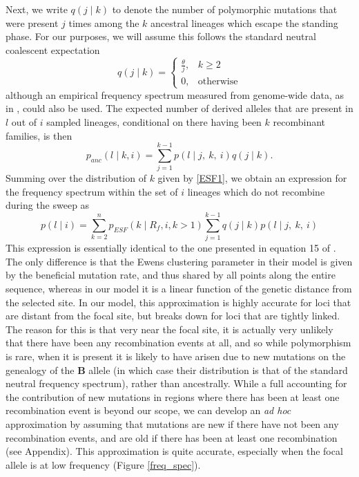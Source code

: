 \documentclass[a4paper,10pt]{article}
\begin{document}
Next, we write $q\left(j \mid k\right)$ to denote the number of polymorphic mutations that were present $j$ times among the $k$ ancestral lineages which escape the standing phase. For our purposes, we will assume this follows the standard neutral coalescent expectation 
\begin{equation}
	q(j \mid k) = 	\begin{cases}
					\frac{\theta}{j}, 	& k \geq 2 \\
					0,			& \text{otherwise}
				\end{cases}
\end{equation}
although an empirical frequency spectrum measured from genome-wide data, as in \cite{Nielsen:2005bla}, could also be used. The expected number of derived alleles that are present in $l$ out of $i$ sampled lineages, conditional on there having been $k$ recombinant families, is then 
\begin{equation}
	p_{anc}(l \mid k, i ) = \sum_{j=1}^{k-1} p(l \mid j,~k, ~i)q(j\mid k).
\end{equation}	
Summing over the distribution of $k$ given by \eqref{ESF1}, we obtain an expression for the frequency spectrum within the set of $i$ lineages which do not recombine during the sweep as
\begin{equation}
	p(l \mid i) =  \sum_{k=2}^{n}  p_{ESF}(k \mid R_f,i,k>1)  \sum_{j=1}^{k-1} q(j\mid k) p(l \mid j,~k, ~i) \label{no-sweep-rec-freq-spec}
\end{equation}
This expression is essentially identical to the one presented in equation 15 of \cite{Pennings2006}. The only difference is that the Ewens clustering parameter in their model is given by the beneficial mutation rate, and thus shared by all points along the entire sequence, whereas in our model it is a linear function of the genetic distance from the selected site. In our model, this approximation is highly accurate for loci that are distant from the focal site, but breaks down for loci that are tightly linked. The reason for this is that very near the focal site, it is actually very unlikely that there have been any recombination events at all, and so while polymorphism is rare, when it is present it is likely to have arisen due to new mutations on the genealogy of the $\textbf{B}$ allele (in which case their distribution is that of the standard neutral frequency spectrum), rather than ancestrally. While a full accounting for the contribution of new mutations in regions where there has been at least one recombination event is beyond our scope, we can develop an \textit{ad hoc} approximation by assuming that mutations are new if there have not been any recombination events, and are old if there has been at least one recombination (see Appendix). This approximation is quite accurate, especially when the focal allele is at low frequency (Figure \ref{freq_spec}).
\end{document}
